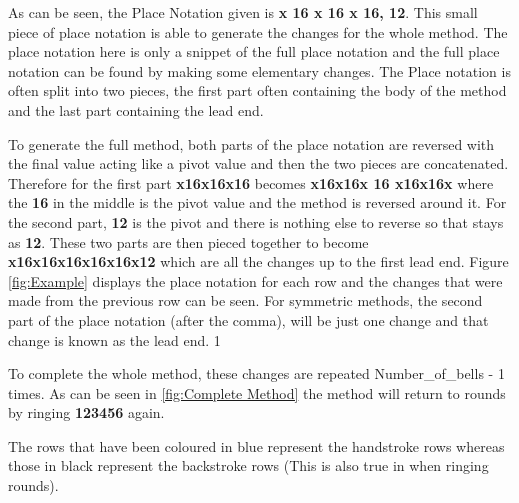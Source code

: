 \documentclass{l4proj}
\begin{document}
As can be seen, the Place Notation given is \textbf{x 16 x 16 x 16, 12}. This small piece of place notation is able to generate the changes for the whole method. The place notation here is only a snippet of the full place notation and the full place notation can be found by making some elementary changes. The Place notation is often split into two pieces, the first part often containing the body of the method and the last part containing the lead end. 

To generate the full method, both parts of the place notation are reversed with the final value acting like a pivot value and then the two pieces are concatenated. Therefore for the first part \textbf{x16x16x16} becomes \textbf{x16x16x 16 x16x16x} where the \textbf{16} in the middle is the pivot value and the method is reversed around it. For the second part, \textbf{12} is the pivot and there is nothing else to reverse so that stays as \textbf{12}.  These two parts are then pieced together to become \textbf{x16x16x16x16x16x12} which are all the changes up to the first lead end.  Figure \ref{fig:Example} displays the place notation for each row and the changes that were made from the previous row can be seen. For symmetric methods, the second part of the place notation (after the comma), will be just one change and that change is known as the lead end. 1

To complete the whole method, these changes are repeated Number\_of\_bells - 1 times. As can be seen in \ref{fig:Complete Method} the method will return to rounds by ringing \textbf{123456} again.

The rows that have been coloured in blue represent the handstroke rows whereas those in black represent the backstroke rows (This is also true in when ringing rounds). 
\end{document}

